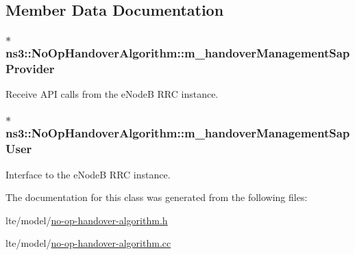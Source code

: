 \subsection{Member Data Documentation}
\subsubsection[{\texorpdfstring{m\+\_\+handover\+Management\+Sap\+Provider}{m_handoverManagementSapProvider}}]{ $\ast$ ns3\+::\+No\+Op\+Handover\+Algorithm\+::m\+\_\+handover\+Management\+Sap\+Provider\hspace{0.3cm}{\ttfamily [private]}}\hypertarget{classns3_1_1NoOpHandoverAlgorithm_a7cdea317d0f26f7fe98418cb31ac72ab}{}\label{classns3_1_1NoOpHandoverAlgorithm_a7cdea317d0f26f7fe98418cb31ac72ab}


Receive A\+PI calls from the e\+NodeB R\+RC instance. 

\subsubsection[{\texorpdfstring{m\+\_\+handover\+Management\+Sap\+User}{m_handoverManagementSapUser}}]{ $\ast$ ns3\+::\+No\+Op\+Handover\+Algorithm\+::m\+\_\+handover\+Management\+Sap\+User\hspace{0.3cm}{\ttfamily [private]}}\hypertarget{classns3_1_1NoOpHandoverAlgorithm_aac1dfb01c1f8bdf46f16b3fe5eec6a1d}{}\label{classns3_1_1NoOpHandoverAlgorithm_aac1dfb01c1f8bdf46f16b3fe5eec6a1d}


Interface to the e\+NodeB R\+RC instance. 



The documentation for this class was generated from the following files\+:\begin{DoxyCompactItemize}
\item 
lte/model/\hyperlink{lte_2model_2no-op-handover-algorithm_8h}{no-\/op-\/handover-\/algorithm.\+h}\item 
lte/model/\hyperlink{lte_2model_2no-op-handover-algorithm_8cc}{no-\/op-\/handover-\/algorithm.\+cc}\end{DoxyCompactItemize}
